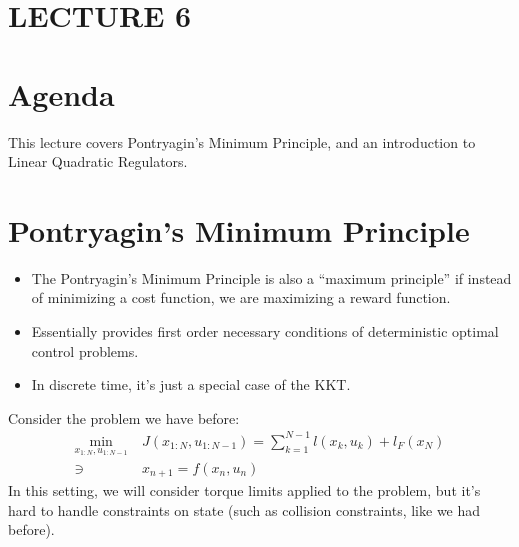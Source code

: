 \newpage
\section{LECTURE 6}

\section{Agenda}
This lecture covers Pontryagin's Minimum Principle, and an introduction to Linear Quadratic Regulators. 

\section{Pontryagin's Minimum Principle}
\begin{itemize}
    \item The Pontryagin's Minimum Principle is also a ``maximum principle'' if instead of minimizing a cost function, we are maximizing a reward function. 
    \item Essentially provides first order necessary conditions of deterministic optimal control problems. 
    \item In discrete time, it's just a special case of the KKT. 
\end{itemize}
Consider the problem we have before: 
\begin{align}
    \min_{x_{1:N}, u_{1:N-1}} \ & J(x_{1:N}, u_{1:N-1}) = \sum_{k=1}^{N-1} l(x_k, u_k) + l_F(x_N) \\
    \ni \ & x_{n+1} = f(x_n,u_n)
\end{align}
In this setting, we will consider torque limits applied to the problem, but it's hard to handle constraints on state (such as collision constraints, like we had before). 

